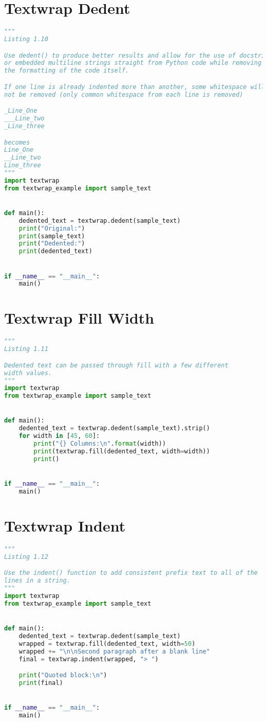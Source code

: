 \documentclass[a4paper,landscape]{report}
\begin{document}
\section{Textwrap Dedent}
\begin{lstlisting}[language=Python]
"""
Listing 1.10

Use dedent() to produce better results and allow for the use of docstrings
or embedded multiline strings straight from Python code while removing
the formatting of the code itself.

If one line is already indented more than another, some whitespace will
not be removed (only common whitespace from each line is removed)

_Line_One
___Line_two
_Line_three

becomes
Line_One
__Line_two
Line_three
"""
import textwrap
from textwrap_example import sample_text


def main():
    dedented_text = textwrap.dedent(sample_text)
    print("Original:")
    print(sample_text)
    print("Dedented:")
    print(dedented_text)


if __name__ == "__main__":
    main()

\end{lstlisting}
\section{Textwrap Fill Width}
\begin{lstlisting}[language=Python]
"""
Listing 1.11

Dedented text can be passed through fill with a few different
width values.
"""
import textwrap
from textwrap_example import sample_text


def main():
    dedented_text = textwrap.dedent(sample_text).strip()
    for width in [45, 60]:
        print("{} Columns:\n".format(width))
        print(textwrap.fill(dedented_text, width=width))
        print()


if __name__ == "__main__":
    main()

\end{lstlisting}
\section{Textwrap Indent}
\begin{lstlisting}[language=Python]
"""
Listing 1.12

Use the indent() function to add consistent prefix text to all of the
lines in a string.
"""
import textwrap
from textwrap_example import sample_text


def main():
    dedented_text = textwrap.dedent(sample_text)
    wrapped = textwrap.fill(dedented_text, width=50)
    wrapped += "\n\nSecond paragraph after a blank line"
    final = textwrap.indent(wrapped, "> ")

    print("Quoted block:\n")
    print(final)


if __name__ == "__main__":
    main()

\end{lstlisting}
\end{document}
